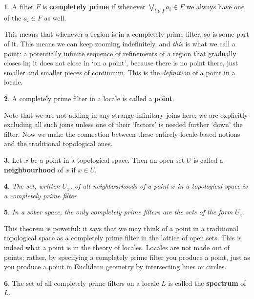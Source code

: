 \documentclass[oneside,english]{amsbook}
\numberwithin{section}{chapter}
\theoremstyle{plain}
\newtheorem{thm}{\protect\theoremname}
\theoremstyle{definition}
\newtheorem{defn}[thm]{\protect\definitionname}
\providecommand{\definitionname}{Definition}
\providecommand{\theoremname}{Theorem}
\begin{document}
\begin{defn} 
	A filter $F$ is \textbf{completely prime }if whenever $\bigvee_{i\in I}a_{i}\in F$ we always have one of the $a_{i}\in F$ as well. 
\end{defn} 

This means that whenever a region is in a completely prime filter, so is some part of it. This means we can keep zooming indefinitely, and \emph{this} is what we call a point: a potentially infinite sequence of refinements of a region that gradually closes in; it does not close in `on a point', because there is no point there, just smaller and smaller pieces of continuum. This is the \emph{definition} of a point in a locale. 

\begin{defn} 
	A completely prime filter in a locale is called a \textbf{point}. 
\end{defn}

Note that we are not adding in any strange infinitary joins here; we are explicitly excluding all such joins unless one of their `factors' is needed further `down' the filter. Now we make the connection between these entirely locale-based notions and the traditional topological ones.

\begin{defn}
	Let $x$ be a point in a topological space. Then an open set $U$ is called a \textbf{neighbourhood} of $x$ if $x\in U$.\end{defn}

\begin{thm}
	The set, written $U_x$, of all neighbourhoods of a point $x$ in a topological space is a completely prime filter.
\end{thm}

\begin{thm}
	In a sober space, the only completely prime filters are the sets of the form $U_x$.
\end{thm}

This theorem is powerful: it says that we may think of a point in a traditional topological space as a completely prime filter in the lattice of open sets. This is indeed what a point is in the theory of locales. Locales are not made out of points; rather, by specifying a completely prime filter you produce a point, just as you produce a point in Euclidean geometry by intersecting lines or circles.

\begin{defn}
	The set of all completely prime filters on a locale $L$ is called the \textbf{spectrum} of $L$.
\end{defn}
\end{document}
